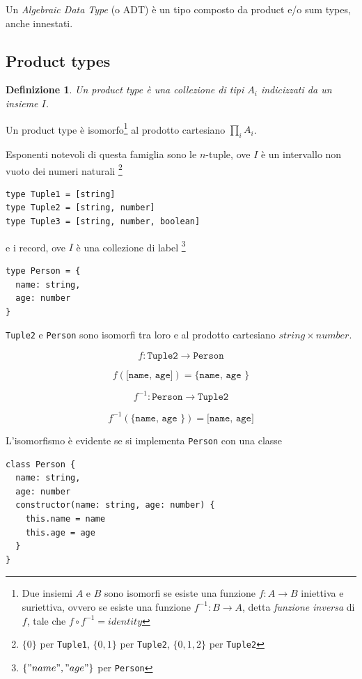 \documentclass[12pt]{article}
\newtheorem{definition}{Definizione}[section]
\begin{document}
Un \emph{Algebraic Data Type} (o ADT) è un tipo composto da product e/o sum types, anche innestati.

\subsection{Product types}

\begin{definition}
Un product type è una collezione di tipi $A_i$ indicizzati da un insieme $I$.
\end{definition}

Un product type è isomorfo\footnote{Due insiemi $A$ e $B$ sono isomorfi se esiste una funzione $f: A \rightarrow B$ iniettiva e suriettiva,
ovvero se esiste una funzione $f^{-1}: B \rightarrow A$, detta \emph{funzione inversa} di $f$, tale che $f \circ f^{-1} = identity$}
al prodotto cartesiano $\prod_i A_i$.

Esponenti notevoli di questa famiglia sono le $n$-tuple, ove $I$ è un intervallo non vuoto dei numeri naturali
\footnote{$\{0\}$ per \texttt{Tuple1}, $\{0, 1\}$ per \texttt{Tuple2}, $\{0, 1, 2\}$ per \texttt{Tuple2}}

\begin{verbatim}
type Tuple1 = [string]
type Tuple2 = [string, number]
type Tuple3 = [string, number, boolean]
\end{verbatim}

e i record, ove $I$ è una collezione di label
\footnote{$\{ "name", "age" \}$ per \texttt{Person}}

\begin{verbatim}
type Person = {
  name: string,
  age: number
}
\end{verbatim}

\texttt{Tuple2} e \texttt{Person} sono isomorfi tra loro e al prodotto cartesiano $string \times number$.

$$
f: \texttt{Tuple2} \rightarrow \texttt{Person}
$$

$$
f(\texttt{[name, age]}) = \texttt{\{ name, age  \}}
$$

$$
f^{-1}: \texttt{Person} \rightarrow \texttt{Tuple2}
$$

$$
f^{-1}(\texttt{\{ name, age  \}}) = \texttt{[name, age]}
$$

L'isomorfismo è evidente se si implementa \texttt{Person} con una classe

\begin{verbatim}
class Person {
  name: string,
  age: number
  constructor(name: string, age: number) {
    this.name = name
    this.age = age
  }
}
\end{verbatim}
\end{document}
